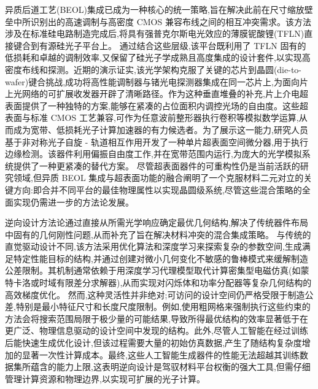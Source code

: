 \documentclass[11pt]{article}
\begin{document}
异质后道工艺(BEOL)集成已成为一种核心的统一策略,旨在解决此前在尺寸缩放壁垒中所识别出的高速调制与高密度 CMOS 兼容布线之间的相互冲突需求。该方法涉及在标准硅电路制造完成后,将具有强普克尔斯电光效应的薄膜铌酸锂(TFLN)直接键合到有源硅光子平台上。\citep{s2_9b444e84d20ae6e3d62d2d4df30268b5a53baad2_40af2cc9} 通过结合这些层级,该平台既利用了 TFLN 固有的低损耗和卓越的调制效率,又保留了硅光子学成熟且高度集成的设计套件,以实现高密度布线和探测。近期的演示证实,该光学架构克服了关键的芯片到晶圆(die-to-wafer)键合挑战,成功将高性能调制器与锗光电探测器集成在同一芯片上,为面向片上光网络的可扩展收发器开辟了清晰路径。作为这种垂直堆叠的补充,片上介电超表面提供了一种独特的方案,能够在紧凑的占位面积内调控光场的自由度。这些超表面与标准 CMOS 工艺兼容,可作为任意波前整形器执行卷积等模拟数学运算,从而成为宽带、低损耗光子计算加速器的有力候选者。为了展示这一能力,研究人员基于非对称光子自旋 - 轨道相互作用开发了一种单片超表面空间微分器,用于执行边缘检测。该器件利用偏振自由度工作,并在宽带范围内运行,为庞大的光学模拟系统提供了一种更紧凑的替代方案。\citep{doi_10_1515_nanoph_2020_0366_58f1aa1d} 尽管超表面器件的可重构性仍是当前活跃的研究领域,但异质 BEOL 集成与超表面功能的融合阐明了一个克服材料二元对立的关键方向:即合并不同平台的最佳物理属性以实现晶圆级系统,尽管这些混合策略的全面实现仍需进一步的方法论发展。\citep{s2_9b444e84d20ae6e3d62d2d4df30268b5a53baad2_40af2cc9} \citep{doi_10_1515_nanoph_2022_0294_1bd118d5}

逆向设计方法论通过直接从所需光学响应确定最优几何结构,解决了传统器件布局中固有的几何刚性问题,从而补充了旨在解决材料冲突的混合集成策略。\citep{doi_10_1364_oe_524318_cf5f0d79} \citep{doi_10_1364_ol_453299_4bc70b17} 与传统的直觉驱动设计不同,该方法采用优化算法和深度学习来探索复杂的参数空间,生成满足特定性能目标的结构,并通过创建对微小几何变化不敏感的鲁棒模式来缓解制造公差限制。其机制通常依赖于用深度学习代理模型取代计算密集型电磁仿真(如蒙特卡洛或时域有限差分求解器),从而实现对闪烁体和功率分配器等复杂几何结构的高效梯度优化。\citep{doi_10_1109_jmmct_2026_3695747_9d633c4d} \citep{doi_10_17725_j_rensit_2026_18_163_741010b8} 然而,这种灵活性并非绝对;可访问的设计空间仍严格受限于制造公差,特别是最小特征尺寸和长度尺度限制。例如,使用粗网格来强制执行这些约束的方法会将搜索范围局限于极少量的可能结果,导致所得最优结构的效率显著低于在更广泛、物理信息驱动的设计空间中发现的结构。此外,尽管人工智能在经过训练后能快速生成优化设计,但该过程需要大量的初始仿真数据,产生了随结构复杂度增加的显著一次性计算成本。最终,这些人工智能生成器件的性能无法超越其训练数据集所蕴含的能力上限,这表明逆向设计是驾驭材料平台权衡的强大工具,但需仔细管理计算资源和物理边界,以实现可扩展的光子计算。\citep{doi_10_1515_nanoph_2024_0536_4b6631ba} \citep{doi_10_1515_nanoph_2023_0852_cb27a26f} \citep{doi_10_1109_cleo_europe_eqec65582_2025_11110329_26a41a7d}
\end{document}
